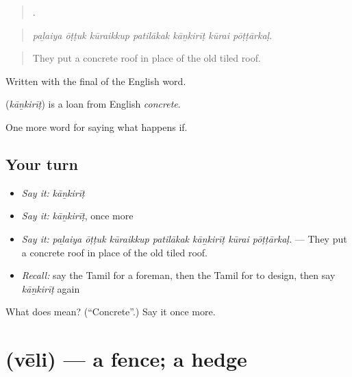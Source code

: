 \begin{quote}
      .
\end{quote}

\begin{quote}
\emph{paḻaiya ōṭṭuk kūraikkup patilākak kāṉkirīṭ kūrai pōṭṭārkaḷ.}
\end{quote}

\begin{quote}
They put a concrete roof in place of the old tiled roof.
\end{quote}

Written with the final  of the English word.

\begin{cousinweb}
\textbf{} (\emph{kāṉkirīṭ}) is a loan from English \emph{concrete}.
\end{cousinweb}

\begin{grammarlens}[title={What you've built}]
One more word for saying what happens if.
\end{grammarlens}

\subsection*{Your turn}
\begin{itemize}
\raggedright
  \item \emph{Say it:} \emph{kāṉkirīṭ}
  \item \emph{Say it:} \emph{kāṉkirīṭ}, once more
  \item \emph{Say it:} \emph{paḻaiya ōṭṭuk kūraikkup patilākak kāṉkirīṭ kūrai pōṭṭārkaḷ.} — They put a concrete roof in place of the old tiled roof.
  \item \emph{Recall:} say the Tamil for a foreman, then the Tamil for to design, then say \emph{kāṉkirīṭ} again
\end{itemize}

\begin{tcolorbox}[breakable,colback=teal!4,colframe=teal!35!black,title={Before you move on}]
What does  mean? (\textquotedblleft{}Concrete\textquotedblright{}.) Say it once more.
\end{tcolorbox}
\section[\texorpdfstring{\ta{வேலி} (vēli)}{வேலி (vēli)}]{ (vēli) — a fence; a hedge}

